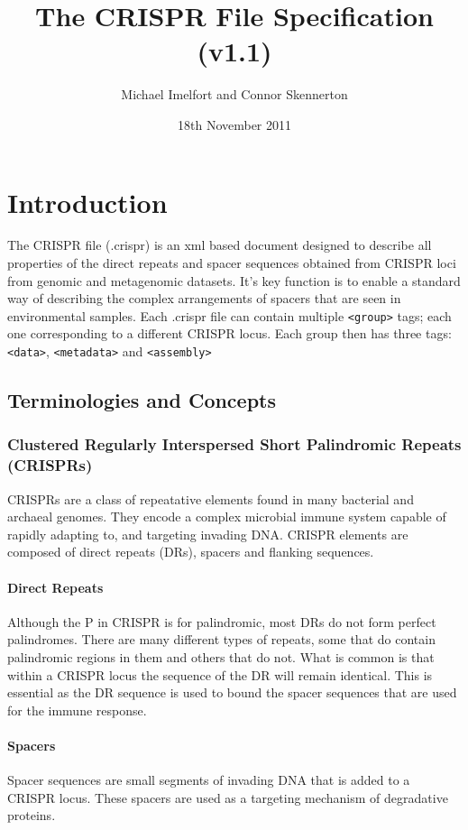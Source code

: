 \documentclass[11pt]{article} %
\title{The CRISPR File Specification (v1.1)}
\author{Michael Imelfort and Connor Skennerton}
\date{18th November 2011} %
\begin{document}
\maketitle

\section{Introduction}

The CRISPR file (.crispr) is an xml based document designed to describe all properties of the direct repeats and spacer sequences obtained from CRISPR loci from genomic and metagenomic datasets.  It's key function is to enable a standard way of describing the complex arrangements of spacers that are seen in environmental samples.  Each .crispr file can contain multiple  \lstinline[language=XML_new]$<group>$   tags; each one corresponding to a different CRISPR locus.  Each group then has three tags: \lstinline[language=XML_new]$<data>$, \lstinline[language=XML_new]$<metadata>$ and \lstinline[language=XML_new]$<assembly>$ 
\subsection{Terminologies and Concepts}
\subsubsection{Clustered Regularly Interspersed Short Palindromic Repeats (CRISPRs)}
CRISPRs are a class of repeatative elements found in many bacterial and archaeal genomes.  They encode a complex microbial immune system capable of rapidly adapting to, and targeting invading DNA.  CRISPR elements are composed of direct repeats (DRs), spacers and flanking sequences.
\paragraph{Direct Repeats}
Although the P in CRISPR is for palindromic, most DRs do not form perfect palindromes.  There are many different types of repeats, some that do contain palindromic regions in them and others that do not.  What is common is that within a CRISPR locus the sequence of the DR will remain identical. This is essential as the DR sequence is used to bound the spacer sequences that are used for the immune response.
\paragraph{Spacers}
Spacer sequences are small segments of invading DNA that is added to a CRISPR locus.  These spacers are used as a targeting mechanism of degradative proteins. 
\end{document}
